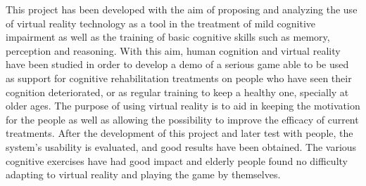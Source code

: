 This project has been developed with the aim of proposing and analyzing the use of virtual reality technology as a tool in the treatment of mild cognitive impairment as well as the training of basic cognitive skills such as memory, perception and reasoning. With this aim, human cognition and virtual reality have been studied in order to develop a demo of a serious game able to be used as support for cognitive rehabilitation treatments on people who have seen their cognition deteriorated, or as regular training to keep a healthy one, specially at older ages. The purpose of using virtual reality is to aid in keeping the motivation for the people as well as allowing the possibility to improve the efficacy of current treatments. After the development of this project and later test with people, the system's usability is evaluated, and good results have been obtained. The various cognitive exercises have had good impact and elderly people found no difficulty adapting to virtual reality and playing the game by themselves.





\blankpage
